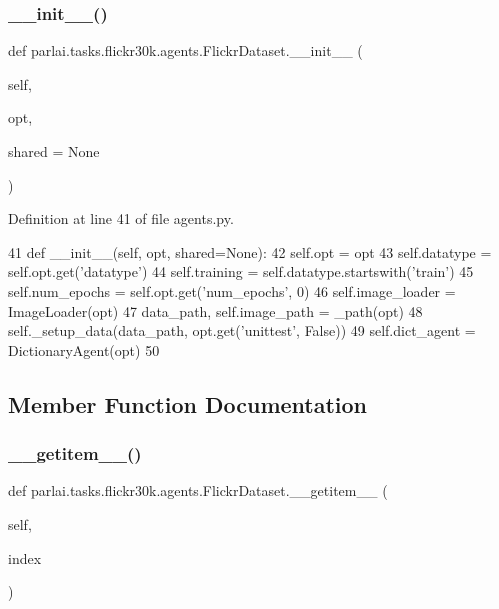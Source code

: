 \subsubsection{\texorpdfstring{\+\_\+\+\_\+init\+\_\+\+\_\+()}{\_\_init\_\_()}}
{\footnotesize\ttfamily def parlai.\+tasks.\+flickr30k.\+agents.\+Flickr\+Dataset.\+\_\+\+\_\+init\+\_\+\+\_\+ (\begin{DoxyParamCaption}\item[{}]{self,  }\item[{}]{opt,  }\item[{}]{shared = {\ttfamily None} }\end{DoxyParamCaption})}



Definition at line 41 of file agents.\+py.


\begin{DoxyCode}
41     \textcolor{keyword}{def }\_\_init\_\_(self, opt, shared=None):
42         self.opt = opt
43         self.datatype = self.opt.get(\textcolor{stringliteral}{'datatype'})
44         self.training = self.datatype.startswith(\textcolor{stringliteral}{'train'})
45         self.num\_epochs = self.opt.get(\textcolor{stringliteral}{'num\_epochs'}, 0)
46         self.image\_loader = ImageLoader(opt)
47         data\_path, self.image\_path = \_path(opt)
48         self.\_setup\_data(data\_path, opt.get(\textcolor{stringliteral}{'unittest'}, \textcolor{keyword}{False}))
49         self.dict\_agent = DictionaryAgent(opt)
50 
\end{DoxyCode}


\subsection{Member Function Documentation}
\mbox{\label{classparlai_1_1tasks_1_1flickr30k_1_1agents_1_1FlickrDataset_aba1193cd19baf55824c0ec3bd735b56f}} 
\subsubsection{\texorpdfstring{\+\_\+\+\_\+getitem\+\_\+\+\_\+()}{\_\_getitem\_\_()}}
{\footnotesize\ttfamily def parlai.\+tasks.\+flickr30k.\+agents.\+Flickr\+Dataset.\+\_\+\+\_\+getitem\+\_\+\+\_\+ (\begin{DoxyParamCaption}\item[{}]{self,  }\item[{}]{index }\end{DoxyParamCaption})}



